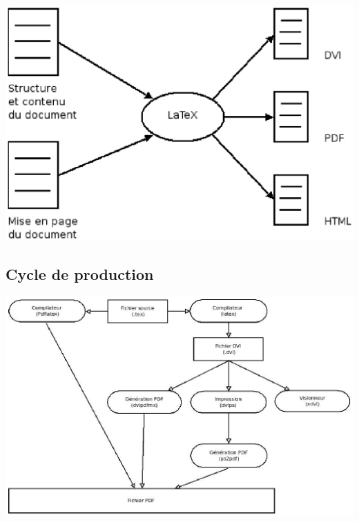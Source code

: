\documentclass[12pt]{beamer}
\begin{document}
  \begin{frame}
   \includegraphics[width=11 cm,height=7 cm]{image/structure.ps}
  \end{frame}

\subsection{Cycle de production}

  \begin{frame}
    \includegraphics[width=11 cm,height=7 cm]{image/production.ps}
  \end{frame}
\end{document}
